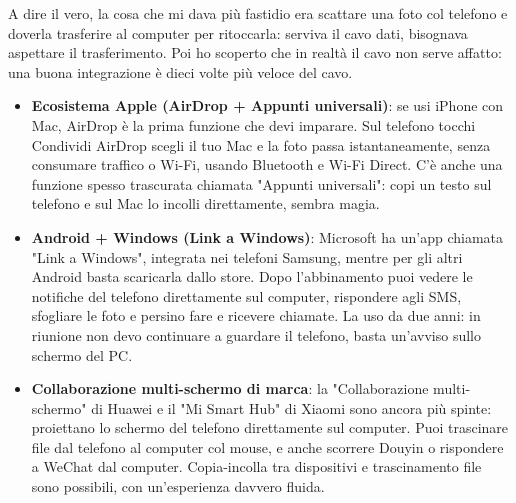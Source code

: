 


A dire il vero, la cosa che mi dava più fastidio era scattare una foto col telefono e doverla trasferire al computer per ritoccarla: serviva il cavo dati, bisognava aspettare il trasferimento. Poi ho scoperto che in realtà il cavo non serve affatto: una buona integrazione è dieci volte più veloce del cavo.

\begin{itemize}
  \item \textbf{Ecosistema Apple (AirDrop + Appunti universali)}: se usi iPhone con Mac, AirDrop è la prima funzione che devi imparare. Sul telefono tocchi Condividi AirDrop scegli il tuo Mac e la foto passa istantaneamente, senza consumare traffico o Wi-Fi, usando Bluetooth e Wi-Fi Direct. C'è anche una funzione spesso trascurata chiamata "Appunti universali": copi un testo sul telefono e sul Mac lo incolli direttamente, sembra magia.
  \item \textbf{Android + Windows (Link a Windows)}: Microsoft ha un'app chiamata "Link a Windows", integrata nei telefoni Samsung, mentre per gli altri Android basta scaricarla dallo store. Dopo l'abbinamento puoi vedere le notifiche del telefono direttamente sul computer, rispondere agli SMS, sfogliare le foto e persino fare e ricevere chiamate. La uso da due anni: in riunione non devo continuare a guardare il telefono, basta un'avviso sullo schermo del PC.
  \item \textbf{Collaborazione multi-schermo di marca}: la "Collaborazione multi-schermo" di Huawei e il "Mi Smart Hub" di Xiaomi sono ancora più spinte: proiettano lo schermo del telefono direttamente sul computer. Puoi trascinare file dal telefono al computer col mouse, e anche scorrere Douyin o rispondere a WeChat dal computer. Copia-incolla tra dispositivi e trascinamento file sono possibili, con un'esperienza davvero fluida.
\end{itemize}


